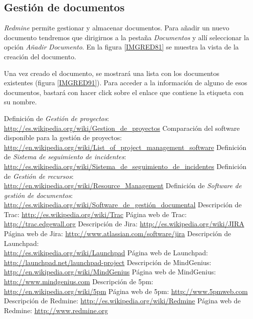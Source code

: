 \documentclass[11pt,a4paper,spanish,twoside]{report}
\begin{document}
	\subsection{Gestión de documentos}

        \emph{Redmine} permite gestionar y almacenar documentos. Para añadir
        un nuevo documento tendremos que dirigirnos a la pestaña
				\emph{Documentos} y allí seleccionar la opción \emph{Añadir Documento}.
				En la figura \ref{IMGRED81} se muestra la vista de la creación del
				documento.


        Una vez creado el documento, se mostrará una lista con los documentos
				existentes (figura \ref{IMGRED91}). Para acceder a la información de 
				alguno de esos documentos, bastará con hacer click sobre el enlace
				que contiene la etiqueta con su nombre.


\begin{thebibliography}{99}
 Definición de \emph{Gestión de proyectos}:
\\ \url{http://es.wikipedia.org/wiki/Gestion_de_proyectos}
 Comparación del software disponible para la gestión de proyectos:
\\ \url{http://en.wikipedia.org/wiki/List_of_project_management_software}
 Definición de \emph{Sistema de seguimiento de incidentes}:
\\ \url{http://es.wikipedia.org/wiki/Sistema_de_seguimiento_de_incidentes}
 Definición de \emph{Gestión de recursos}:
\\ \url{http://en.wikipedia.org/wiki/Resource_Management}
 Definición de \emph{Software de gestión de documentos}:
\\ \url{http://es.wikipedia.org/wiki/Software_de_gestión_documental}
 Descripción de Trac:
  \url{http://es.wikipedia.org/wiki/Trac}
 Página web de Trac:
  \url{http://trac.edgewall.org}
 Descripción de Jira:
  \url{http://es.wikipedia.org/wiki/JIRA}
 Página web de Jira:
  \url{http://www.atlassian.com/software/jira}
 Descripción de Launchpad:\\
  \url{http://es.wikipedia.org/wiki/Launchpad}
 Página web de Launchpad:\\
  \url{http://launchpad.net/launchpad-project}
 Descripción de MindGenius:\\
  \url{http://en.wikipedia.org/wiki/MindGenius}
 Página web de MindGenius:
  \url{http://www.mindgenius.com}
 Descripción de 5pm:
  \url{http://en.wikipedia.org/wiki/5pm}
 Página web de 5pm:
  \url{http://www.5pmweb.com}
 Descripción de Redmine:
  \url{http://es.wikipedia.org/wiki/Redmine}
 Página web de Redmine:
  \url{http://www.redmine.org}
\end{thebibliography}
\end{document}
